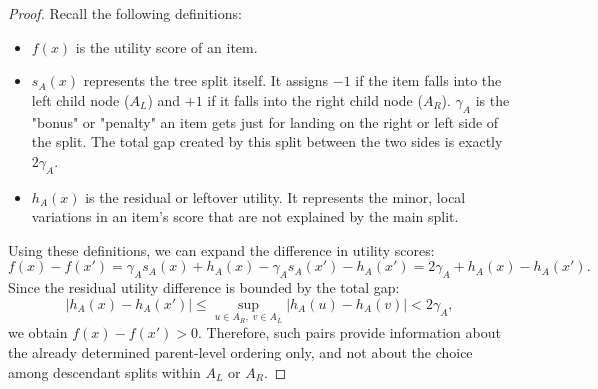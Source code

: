 \documentclass[10pt,a4paper]{amsart}
\begin{document}
\begin{proof}
Recall the following definitions:
\begin{itemize}
\item $f(x)$ is the utility score of an item.
\item $s_A(x)$ represents the tree split itself. It assigns $-1$ if the item falls into the left child node ($A_L$) and $+1$ if it falls into the right child node ($A_R$). $\gamma_A$ is the "bonus" or "penalty" an item gets just for landing on the right or left side of the split. The total gap created by this split between the two sides is exactly $2\gamma_A$.
\item $h_A(x)$ is the residual or leftover utility. It represents the minor, local variations in an item's score that are not explained by the main split. 
\end{itemize}

Using these definitions, we can expand the difference in utility scores:
\[
f(x)-f(x')
=
\gamma_A s_A(x)+h_A(x)-\gamma_A s_A(x')-h_A(x')
=
2\gamma_A + h_A(x)-h_A(x').
\]
Since the residual utility difference is bounded by the total gap:
\[
|h_A(x)-h_A(x')|
\le
\sup_{u\in A_R,\;v\in A_L}|h_A(u)-h_A(v)|
<
2\gamma_A,
\]
we obtain $f(x)-f(x')>0$. Therefore, such pairs provide information about the already determined parent-level ordering only, and not about the choice among descendant splits within $A_L$ or $A_R$.
\end{proof}
\end{document}
